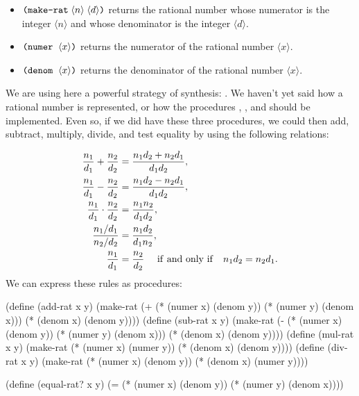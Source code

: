 \begin{itemize}
\item
\( \text{\texttt{(make-rat}}\; \langle n \rangle \; \langle d \rangle \text{\texttt{)}} \)
returns the rational number whose numerator is the integer
\( \langle n \rangle \) and whose denominator is the integer
\( \langle d \rangle \).

\item
\( \text{\texttt{(numer}}\;\; \langle x \rangle \text{\texttt{)}} \) returns
the numerator of the rational number \( \langle x \rangle \).

\item
\( \text{\texttt{(denom}}\;\; \langle x \rangle \text{\texttt{)}} \) returns
the denominator of the rational number \( \langle x \rangle \).
\end{itemize}

\noindent
We are using here a powerful strategy of synthesis: .
We haven't yet said how a rational number is represented, or how the procedures
, , and  should be implemented.  Even
so, if we did have these three procedures, we could then add, subtract,
multiply, divide, and test equality by using the following relations:

\begin{align*}
  \frac{n_1}{d_1} + \frac{n_2}{d_2} 	&= \frac{n_1 d_2 + n_2 d_1}{d_1 d_2}, \\
  \frac{n_1}{d_1} - \frac{n_2}{d_2} 	&= \frac{n_1 d_2 - n_2 d_1}{d_1 d_2}, \\
  \frac{n_1}{d_1} \cdot \frac{n_2}{d_2}	&= \frac{n_1 n_2}{d_1 d_2}, \\
  \frac{{n_1 / d_1}}{{n_2 / d_2}} 	&= \frac{n_1 d_2}{d_1 n_2}, \\
  \frac{n_1}{d_1} 			&= \frac{n_2}{d_2} \quad
						{\rm\ if\ and\ only\ if\quad}
						n_1 d_2 = n_2 d_1.
\end{align*}
\noindent
We can express these rules as procedures:

\begin{codeBlock}
(define (add-rat x y)
  (make-rat (+ (* (numer x) (denom y))
               (* (numer y) (denom x)))
            (* (denom x) (denom y))))
(define (sub-rat x y)
  (make-rat (- (* (numer x) (denom y))
               (* (numer y) (denom x)))
            (* (denom x) (denom y))))
(define (mul-rat x y)
  (make-rat (* (numer x) (numer y))
            (* (denom x) (denom y))))
(define (div-rat x y)
  (make-rat (* (numer x) (denom y))
            (* (denom x) (numer y))))

(define (equal-rat? x y)
  (= (* (numer x) (denom y))
     (* (numer y) (denom x))))
\end{codeBlock}

